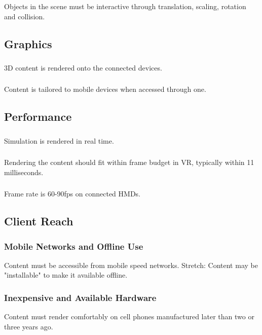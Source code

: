 \documentclass[onecolumn, draftclsnofoot,10pt, compsoc]{IEEEtran}
\begin{document}
\subsubsection{}
Objects in the scene must be interactive through translation, scaling, rotation and collision.

\subsection{Graphics}
\subsubsection{}
3D content is rendered onto the connected devices.
\subsubsection{}
Content is tailored to mobile devices when accessed through one.

\subsection{Performance}
\subsubsection{}
Simulation is rendered in real time.
\subsubsection{}
Rendering the content should fit within frame budget in VR, typically within 11 milliseconds.
\subsubsection{}
Frame rate is 60-90fps on connected HMDs.

\subsection{Client Reach}
\subsubsection{Mobile Networks and Offline Use}
Content must be accessible from mobile speed networks.
Stretch: Content may be "installable" to make it available offline.
\subsubsection{Inexpensive and Available Hardware}
Content must render comfortably on cell phones manufactured later than two or three years ago.
\end{document}
